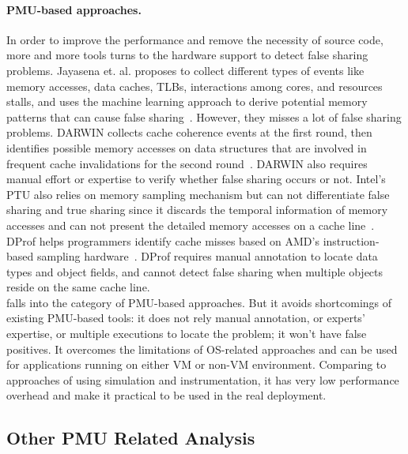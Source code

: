 \paragraph{PMU-based approaches.} In order to improve the performance and remove the necessity of source code, more and more tools turns to the hardware support to detect false sharing problems. Jayasena et. al. proposes to collect different types of events like memory accesses, data caches, TLBs, interactions among cores, and resources stalls, and uses the machine learning approach to derive potential memory patterns that can cause false sharing~\cite{mldetect}. However, they misses a lot of false sharing problems. DARWIN collects cache coherence events at the first round, then identifies possible memory accesses on data structures that are involved in frequent cache invalidations for the second round~\cite{openmp}. DARWIN also requires manual effort or expertise to verify whether false sharing occurs or not. Intel's PTU also relies on memory sampling mechanism but can not differentiate false sharing and true sharing since it discards the temporal information of memory accesses and can not present the detailed memory accesses on a cache line~\cite{detect:ptu}. DProf helps programmers identify cache misses based on AMD's instruction-based sampling hardware~\cite{DProf}. DProf requires manual annotation to locate data types and object fields, and cannot detect false sharing when multiple objects reside on the same cache line. \\

\cheetah{} falls into the category of PMU-based approaches. But it avoids shortcomings of existing PMU-based tools: it does not rely manual annotation, or experts' expertise, or multiple executions to locate the problem; it won't have false positives. It overcomes the limitations of OS-related approaches and can be used for applications running on either VM or non-VM environment. Comparing to approaches of using simulation and instrumentation, it has very low performance overhead and make it practical to be used in the real deployment.   


\subsection{Other PMU Related Analysis}

